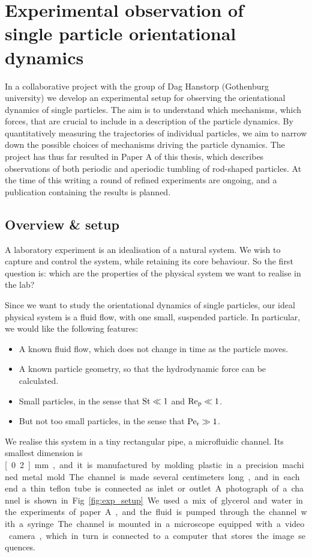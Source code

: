 \documentclass[thesis.tex]{subfiles}
\begin{document}
\chapter[Experimental observations]{Experimental observation of \\single particle orientational dynamics}\label{sec:experiment}

In a collaborative project with the group of Dag Hanstorp (Gothenburg university) we develop an experimental setup for observing the orientational dynamics of single particles. The aim is to understand which mechanisms, which forces, that are crucial to include in a description of the particle dynamics. By quantitatively measuring the trajectories of individual particles, we aim to narrow down the possible choices of mechanisms driving the particle dynamics. The project has thus far resulted in Paper A of this thesis, which describes observations of both periodic and aperiodic tumbling of rod-shaped particles. At the time of this writing a round of refined experiments are ongoing, and a publication containing the results is planned.

\section{Overview \& setup}

A laboratory experiment is an idealisation of a natural system. We wish to capture and control the system, while retaining its core behaviour. So the first question is: which are the properties of the physical system we want to realise in the lab?

Since we want to study the orientational dynamics of single particles, our ideal physical system is a fluid flow, with one small, suspended particle. In particular, we would like the following features:
\begin{itemize}
	\item A known fluid flow, which does not change in time as the particle moves.
	\item A known particle geometry, so that the hydrodynamic force can be calculated.
	\item Small particles, in the sense that $\mbox{St}\ll1$ and $\mbox{Re}_{\mathrm p}\ll1$.
	\item But not too small particles, in the sense that $\mbox{Pe}_{\mathrm r}\gg1$.
\end{itemize}
We realise this system in a tiny rectangular pipe, a microfluidic channel. Its smallest dimension is \unit[0.2]{mm}, and it is manufactured by molding plastic in a precision machined metal mold. The channel is made several centimeters long, and in each end a thin teflon tube is connected as inlet or outlet. A photograph of a channel is shown in Fig.~\ref{fig:exp_setup}. We used a mix of glycerol and water in the experiments of paper A, and the fluid is pumped through the channel with a syringe. The channel is mounted in a microscope equipped with a video camera, which in turn is connected to a computer that stores the image sequences.
\end{document}

